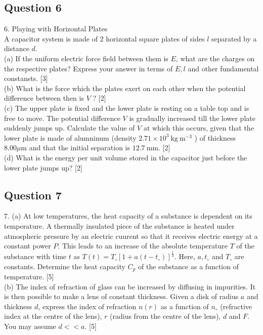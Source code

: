 \documentclass{article}
\begin{document}
\subsection{Question 6}
6. Playing with Horizontal Plates \\ A capacitor system is made of 2 horizontal square plates of sides $l$ separated by a distance $d$. \\
(a) If the uniform electric force field between them is $E$, what are the charges on the respective plates? Express your answer in terms of $E, l$ and other fundamental constansts.  [3] \\
(b) What is the force which the plates exert on each other when the potential difference between then is $V$ ? [2] \\
(c) The upper plate is fixed and the lower plate is resting on a table top and is free to move. The potential difference $V$ is gradually increased till the lower plate suddenly jumps up. Calculate the value of $V$ at which this occurs, given that the lower plate is made of alumninum (density $2.71 \times 10^{3} \mathrm{~kg} \mathrm{~m}^{-3}$ ) of thickness $8.00 \mu \mathrm{m}$ and that the initial separation is $12.7 \mathrm{~mm}$. [2] \\
(d) What is the energy per unit volume stored in the capacitor just before the lower plate jumps up? [2] 

\subsection{Question 7}
7. (a) At low temperatures, the heat capacity of a substance is dependent on its temperature. A thermally insulated piece of the substance is heated under atmospheric pressure by an electric cuurent so that it receives electric energy at a constant power $P$. This leads to an increase of the absolute temperature $T$ of the substance with time $t$ as $T(t)=T_{\circ}\left[1+a\left(t-t_{\circ}\right)\right]^{\frac{1}{3}}$. Here, $a, t_{\circ}$ and $T_{\circ}$ are constants. Determine the heat capacity $C_{p}$ of the substance as a function of temperature. [5] \\
(b) The index of refraction of glass can be increased by diffusing in impurities. It is then possible to make a lens of constant thickness. Given a disk of radius $a$ and thickness $d$, express the index of refraction $n(r)$ as a function of $n_{\circ}$ (refractive index at the centre of the lens), $r$ (radius from the centre of the lens), $d$ and $F$. You may assume $d<<a$. [5]
\end{document}
